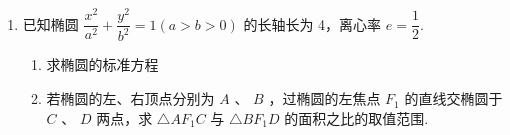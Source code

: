 \begin{enumerate}
\begin{enumerate}
\begin{jieda}
\begin{enumerate}
                $\left\{\begin{array}{l}
                    \dfrac{x^2}{12}+\dfrac{y^2}{3} = 1 \\
                    x = my + 3
                \end{array}\right.$，消去$x$得$(4+m^2)y^2+6my-3 = 0$，$\Delta > 0$

                根据韦达定理可知$\left\{\begin{array}{l}
                    y_1+y_2 = \dfrac{-6m}{4+m^2} \\
                    y_1y_2 = \dfrac{-3}{4+m^2}
                \end{array}  \right.$，$\vv{AF} = 3\vv{FB} \Longleftrightarrow y_1 = -3 y_2$，$-\dfrac{10}{3} = \dfrac{y_1}{y_2} + \dfrac{y_2}{y_1} = \dfrac{(y_1+y_2)^2}{y_1y_2} - 2$，即$-\dfrac{4}{3} = \dfrac{-12m^2}{4+m^2}$，解得$m^2 = \dfrac{1}{2}$

                $\vv{PA} = (x_1-2, y_1-\sqrt{2}) = (my_1+1, y_1-\sqrt{2}), \vv{PB} = (x_2-2, y_2-\sqrt{2}) = (my_2+1, y_2-\sqrt{2})$
                
                故$S_{\bigtriangleup  {PAB}} = \dfrac{|(my_1+1)(y_2-\sqrt{2})-(my_2+1)(y_1-\sqrt{2})|}{2} = \dfrac{|(1+\sqrt{2}m)(y_1-y_2)|}{2} = |y_1-y_2| = 4|y_2| = 2|y_1+y_2| = \dfrac{4\sqrt{2}}{3}$
            \end{enumerate}
        \end{jieda}

        \item 已知椭圆 $\dfrac{{x}^{2}}{{a}^{2}} + \dfrac{{y}^{2}}{{b}^{2}} = 1\left( {a > b > 0}\right)$ 的长轴长为 4，离心率 $e = \dfrac{1}{2}$.
        \begin{enumerate}
            \item 求椭圆的标准方程
            \item 若椭圆的左、右顶点分别为 $A$ 、 $B$ ，过椭圆的左焦点 ${F}_{1}$ 的直线交椭圆于 $C$ 、 $D$ 两点，求 $\bigtriangleup  A{F}_{1}C$ 与 $\bigtriangleup B{F}_{1}D$ 的面积之比的取值范围.
        \end{enumerate}


\end{enumerate}
\end{enumerate}
